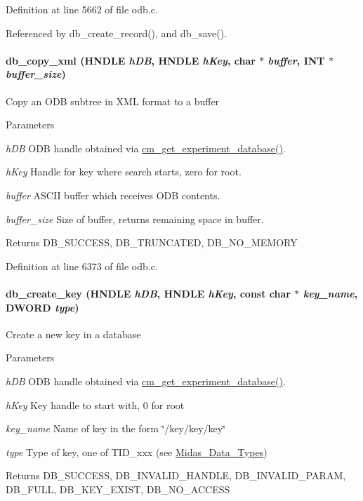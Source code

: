 Definition at line 5662 of file odb.c.

Referenced by db\_\-create\_\-record(), and db\_\-save().
\paragraph[{db\_\-copy\_\-xml}]{ db\_\-copy\_\-xml (HNDLE {\em hDB}, \/  HNDLE {\em hKey}, \/  char $\ast$ {\em buffer}, \/  {\bf INT} $\ast$ {\em buffer\_\-size})}\hfill\label{group__odbfunctionc_ga9fcec4712c44e1ef199297aad9ea99c5}
Copy an ODB subtree in XML format to a buffer


\begin{DoxyParams}{Parameters}
\item[{\em hDB}]ODB handle obtained via \hyperlink{group__cmfunctionc_ga16b33b70783a3f5ba98b4094149d12b7}{cm\_\-get\_\-experiment\_\-database()}. \item[{\em hKey}]Handle for key where search starts, zero for root. \item[{\em buffer}]ASCII buffer which receives ODB contents. \item[{\em buffer\_\-size}]Size of buffer, returns remaining space in buffer. \end{DoxyParams}
\begin{DoxyReturn}{Returns}
DB\_\-SUCCESS, DB\_\-TRUNCATED, DB\_\-NO\_\-MEMORY 
\end{DoxyReturn}


Definition at line 6373 of file odb.c.
\paragraph[{db\_\-create\_\-key}]{ db\_\-create\_\-key (HNDLE {\em hDB}, \/  HNDLE {\em hKey}, \/  const char $\ast$ {\em key\_\-name}, \/  {\bf DWORD} {\em type})}\hfill\label{group__odbfunctionc_ga4dcab15e47980882e35bddf3ceb9aee5}
Create a new key in a database 
\begin{DoxyParams}{Parameters}
\item[{\em hDB}]ODB handle obtained via \hyperlink{group__cmfunctionc_ga16b33b70783a3f5ba98b4094149d12b7}{cm\_\-get\_\-experiment\_\-database()}. \item[{\em hKey}]Key handle to start with, 0 for root \item[{\em key\_\-name}]Name of key in the form \char`\"{}/key/key/key\char`\"{} \item[{\em type}]Type of key, one of TID\_\-xxx (see \hyperlink{F_Midas_Code_and_Libraries_Midas_Data_Types}{Midas\_\-Data\_\-Types}) \end{DoxyParams}
\begin{DoxyReturn}{Returns}
DB\_\-SUCCESS, DB\_\-INVALID\_\-HANDLE, DB\_\-INVALID\_\-PARAM, DB\_\-FULL, DB\_\-KEY\_\-EXIST, DB\_\-NO\_\-ACCESS 
\end{DoxyReturn}



